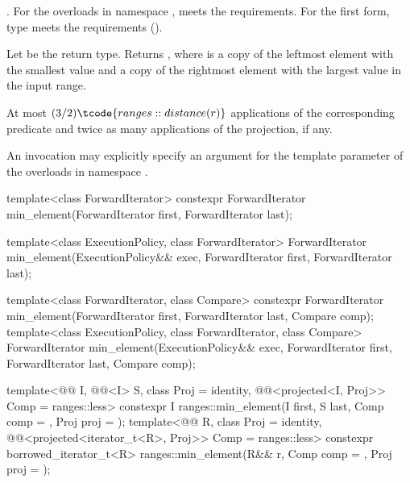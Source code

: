 \begin{itemdescr}
\pnum
\expects
{}.
For the overloads in namespace ,
 meets the  requirements.
For the first form, type  meets the 
requirements ().

\pnum
\returns
Let  be the return type.
Returns ,
where  is a copy of the leftmost element with the smallest value and
 a copy of the rightmost element with the largest value
in the input range.

\pnum
\complexity
At most $(3/2)\tcode{ranges::distance(r)}$ applications
of the corresponding predicate
and twice as many applications of the projection, if any.

\pnum
\remarks
An invocation may explicitly specify
an argument for the template parameter 
of the overloads in namespace .
\end{itemdescr}

%
\begin{itemdecl}
template<class ForwardIterator>
  constexpr ForwardIterator min_element(ForwardIterator first, ForwardIterator last);

template<class ExecutionPolicy, class ForwardIterator>
  ForwardIterator min_element(ExecutionPolicy&& exec,
                              ForwardIterator first, ForwardIterator last);

template<class ForwardIterator, class Compare>
  constexpr ForwardIterator min_element(ForwardIterator first, ForwardIterator last,
                                        Compare comp);
template<class ExecutionPolicy, class ForwardIterator, class Compare>
  ForwardIterator min_element(ExecutionPolicy&& exec,
                              ForwardIterator first, ForwardIterator last, Compare comp);

template<@@ I, @@<I> S, class Proj = identity,
         @@<projected<I, Proj>> Comp = ranges::less>
  constexpr I ranges::min_element(I first, S last, Comp comp = {}, Proj proj = {});
template<@@ R, class Proj = identity,
         @@<projected<iterator_t<R>, Proj>> Comp = ranges::less>
  constexpr borrowed_iterator_t<R>
    ranges::min_element(R&& r, Comp comp = {}, Proj proj = {});
\end{itemdecl}

